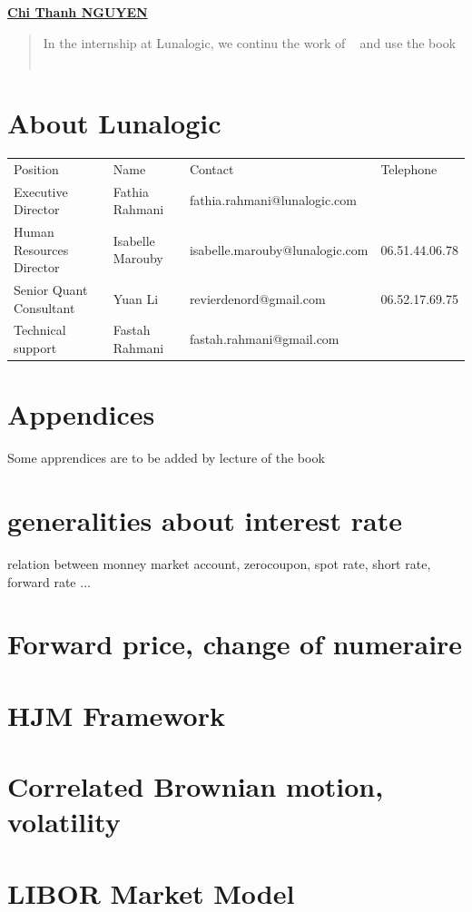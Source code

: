\documentclass[a4paper,10pt]{article}
\begin{document}
\begin{titlepage}
\begin{center}
\href{mailto:chithanhnguyen.math@gmail.com}{\LARGE{\textbf{Chi Thanh NGUYEN}}}
\end{center}



\vfill
\begin{abstract}
In the internship at Lunalogic, we continu the work of ~\cite{THAI2013} and use the book  ~\cite{BRIGO2006}
\end{abstract}
\end{titlepage}


\tableofcontents
\newpage

\section{About Lunalogic}
\begin{tabular}{llll}
Position                 &            Name             & Contact                         &Telephone      \\
Executive Director       & Fathia Rahmani               & fathia.rahmani@lunalogic.com   &               \\
Human Resources Director & Isabelle Marouby             & isabelle.marouby@lunalogic.com &06.51.44.06.78 \\
Senior Quant Consultant  & Yuan Li                      & revierdenord@gmail.com         &06.52.17.69.75 \\    
Technical support        & Fastah Rahmani               & fastah.rahmani@gmail.com       &
\end{tabular}


\section{Appendices}
Some apprendices are to be added by lecture of the book ~\cite{BRIGO2006}
\section{generalities about interest rate}
relation between monney market account, zerocoupon, spot rate, short rate, forward rate ... 
\section{Forward price, change of numeraire}
\section{HJM Framework}
\section{Correlated Brownian motion, volatility}
\section{LIBOR Market Model}




\end{document}
